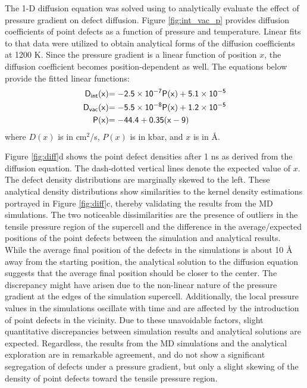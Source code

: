 \documentclass[review]{elsarticle}
\providecommand{\DIFadd}[1]{{\sf #1}} %
\begin{document}
\DIFadd{The 1-D diffusion equation was solved using \Cref{eq:1D_diff} to analytically evaluate the effect of pressure gradient on defect diffusion. Figure \ref{fig:int_vac_p} provides diffusion coefficients of point defects as a function of pressure and temperature. Linear fits to that data were utilized to obtain analytical forms of the diffusion coefficients at 1200 K. Since the pressure gradient is a linear function of position $x$, the diffusion coefficient becomes position-dependent as well. The equations below provide the fitted linear functions:
}\begin{align}
    \DIFadd{D_{int}(x) }&\DIFadd{= -2.5 \times 10^{-7} P(x) + 5.1 \times 10^{-5} }\\
    \DIFadd{D_{vac}(x) }&\DIFadd{= -5.5 \times 10^{-8} P(x) + 1.2 \times 10^{-5} }\\
    \DIFadd{P(x) }&\DIFadd{= -44.4 + 0.35 (x - 9)
}\end{align}
\DIFadd{where $D(x)$ is in cm$^2$/s, $P(x)$ is in kbar, and $x$ is in \r{A}.
}

\DIFadd{Figure \ref{fig:diff}d shows the point defect densities after 1 ns as derived from the diffusion equation. The dash-dotted vertical lines denote the expected value of $x$. The defect density distributions are marginally skewed to the left. These analytical density distributions show similarities to the kernel density estimations portrayed in Figure \ref{fig:diff}c, thereby validating the results from the MD simulations. The two noticeable dissimilarities are the presence of outliers in the tensile pressure region of the supercell and the difference in the average/expected positions of the point defects between the simulation and analytical results. While the average final position of the defects in the simulations is about 10 \r{A} away from the starting position, the analytical solution to the diffusion equation suggests that the average final position should be closer to the center. The discrepancy might have arisen due to the non-linear nature of the pressure gradient at the edges of the simulation supercell. Additionally, the local pressure values in the simulations oscillate with time and are affected by the introduction of point defects in the vicinity. Due to these unavoidable factors, slight quantitative discrepancies between simulation results and analytical solutions are expected. Regardless, the results from the MD simulations and the analytical exploration are in remarkable agreement, and do not show a significant segregation of defects under a pressure gradient, but only a slight skewing of the  density of point defects toward the tensile pressure region. 
}
\end{document}
